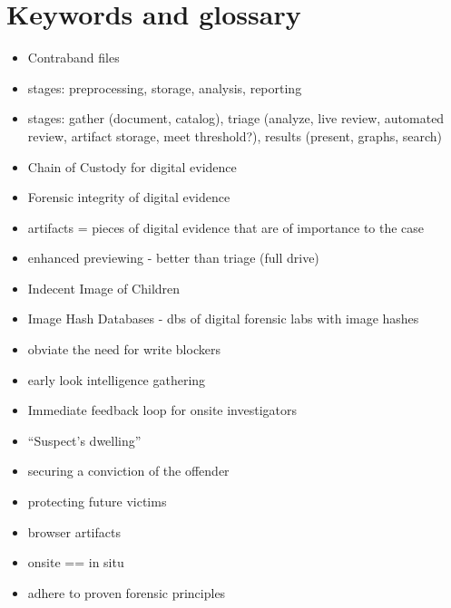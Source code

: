 \documentclass[12pt]{article}
\begin{document}
\section{Keywords and glossary}
\begin{itemize}
  \item Contraband files
  \item stages: preprocessing, storage, analysis, reporting
  \item stages: gather (document, catalog), triage (analyze, live review, automated review, artifact storage,
  meet threshold?), results (present, graphs, search)
  \item Chain of Custody for digital evidence
  \item Forensic integrity of digital evidence
  \item artifacts = pieces of digital evidence that are of importance to the case
  \item enhanced previewing - better than triage (full drive)
  \item Indecent Image of Children
  \item Image Hash Databases - dbs of digital forensic labs with image hashes
  \item obviate the need for write blockers
  \item early look intelligence gathering
  \item Immediate feedback loop for onsite investigators
  \item ``Suspect's dwelling''
  \item securing a conviction of the offender
  \item protecting future victims
  \item browser artifacts
  \item onsite == in situ
  \item adhere to proven forensic principles
\end{itemize}

\newpage
\end{document}
